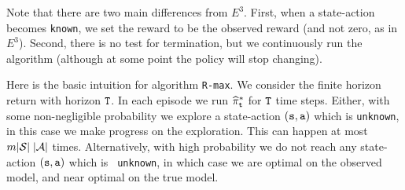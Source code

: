 




Note that there are two main differences from $E^3$. First, when a
state-action becomes \texttt{known}, we set the reward to be the observed
reward (and not zero, as in $E^3$). Second, there is no test for
termination, but we continuously run the algorithm (although at
some point the policy will stop changing).


Here is the basic intuition for algorithm {\tt R-max}. We consider
the finite horizon return with horizon ${\tt T}$.  In each episode
we run $\widehat{\pi}^*_{\tt t}$ for ${\tt T}$ time steps.
Either, with some non-negligible probability we explore a
state-action $({\tt s},{\tt a})$ which is \texttt{unknown}, in this case
we make progress on the exploration.  This can happen at most
$m|\mathcal{S}|\;|\mathcal{A}|$ times. Alternatively, with high probability
we do not reach any state-action $({\tt s},{\tt a})$ which is {\tt
unknown}, in which case we are optimal on the observed model, and
near optimal on the true model.

